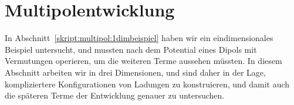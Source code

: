 %
%
%
\section{Multipolentwicklung}
In Abschnitt~\ref{skript:multipol:1dimbeispiel} haben wir ein
eindimensionales Beispiel untersucht, und mussten nach dem Potential
eines Dipols mit Vermutungen operieren, um die weiteren Terme aussehen
müssten.
In diesem Abschnitt arbeiten wir in drei Dimensionen, und sind daher
in der Lage, kompliziertere Konfigurationen von Ladungen zu
konstruieren, und damit auch die späteren Terme der Entwicklung
genauer zu untersuchen.





